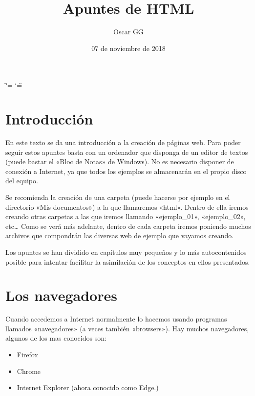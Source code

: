 \documentclass[a4paper,12pt,spanish]{sphinxmanual}
\title{Apuntes de HTML }
\date{07 de noviembre de 2018}
\author{Oscar GG}
\begin{document}
\ifdefined\shorthandoff
  \ifnum\catcode`\=\string=\active\shorthandoff{=}\fi
  \ifnum\catcode`\"=\active{}\fi
\fi

\pagestyle{empty}
\maketitle
\pagestyle{plain}
\sphinxtableofcontents
\pagestyle{normal}
\label{\detokenize{index::doc}}



\chapter{Introducción}
\label{\detokenize{index:introduccion}}
En este texto se da una introducción  a la creación de páginas web. Para poder seguir estos apuntes basta con un ordenador que disponga de un editor de textos (puede bastar el «Bloc de Notas» de Windows). No es necesario disponer de conexión a Internet, ya que todos los ejemplos se almacenarán en el propio disco del equipo.

Se recomienda la creación de una carpeta (puede hacerse por ejemplo en el directorio «Mis documentos») a la que llamaremos «html». Dentro de ella iremos creando otras carpetas a las que iremos llamando «ejemplo\_01», «ejemplo\_02», etc… Como se verá más adelante, dentro de cada carpeta iremos poniendo muchos archivos que compondrán las diversas web de ejemplo que vayamos creando.

Los apuntes se han dividido en capítulos muy pequeños y lo más autocontenidos posible para intentar facilitar la asimilación de los conceptos en ellos presentados.


\chapter{Los navegadores}
\label{\detokenize{index:los-navegadores}}
Cuando accedemos a Internet normalmente lo hacemos usando programas llamados «navegadores» (a veces también «browsers»). Hay muchos navegadores, algunos de los mas conocidos son:
\begin{itemize}
\item {} 
Firefox

\item {} 
Chrome

\item {} 
Internet Explorer (ahora conocido como Edge.)

\end{itemize}
\end{document}

